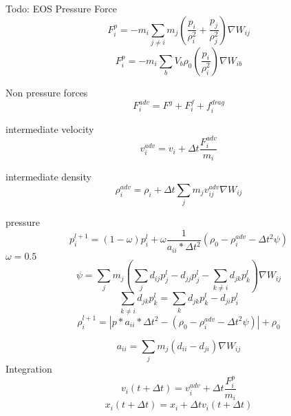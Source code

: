 \documentclass[intern]{cgMA}
\begin{document}
    Todo: EOS
    Pressure Force
    \begin{equation}
        F_i^p = -m_i \sum_{j \neq i} m_j (\frac{p_i}{\rho_i^2} + \frac{p_j}{\rho_j^2})  \nabla W_{ij}
    \end{equation}
    \begin{equation}
        F_i^p = -m_i \sum_{b} V_b \rho_0 (\frac{p_i}{\rho_i^2}) \nabla W_{ib}
    \end{equation}

    Non pressure forces
    \begin{equation}
        F_i^{adv} = F^g + F_i^f + f_i^{drag}
    \end{equation}

    intermediate velocity
    \begin{equation}
        v_i^{adv} = v_i + \Delta t \frac{F_i^{adv}}{m_i}
    \end{equation}

    intermediate density
    \begin{equation}
        \rho_i^{adv} = \rho_i + \Delta t \sum_j m_j v_{ij}^{adv} \nabla W_{ij}
    \end{equation}

    pressure
    \begin{equation}
        p_i^{l+1} = (1 - \omega) p_i^l + \omega \frac{1}{a_{ii} * \Delta t^2} (\rho_0 - \rho_i^{adv} - \Delta t^2 \psi)
    \end{equation}
    $\omega = 0.5$
    \begin{equation}
        \psi = \sum_j m_j (\sum_j d_{ij}p_j^l - d_{jj}p_j^l - \sum_{k \neq i} d_{jk}p_k^l) \nabla W_{ij}
    \end{equation}
    \begin{equation}
        \sum_{k \neq i} d_{jk}p_k^l = \sum_{k} d_{jk}p_k^l - d_{ji}p_i^l
    \end{equation}
    \begin{equation}
        \rho_i^{l+1} = |p * a_{ii} * \Delta t^2 - (\rho_0 - \rho_i^{adv} - \Delta t^2 \psi)| + \rho_0
    \end{equation}

    \begin{equation}
        a_{ii} = \sum_j m_j (d_{ii} - d_{ji}) \nabla W_{ij}
    \end{equation}
    Integration
    \begin{equation}
        v_i(t + \Delta t) = v_i^{adv} + \Delta t \frac{F_i^p}{m_i}
    \end{equation}
    \begin{equation}
        x_i(t + \Delta t) = x_i + \Delta t v_i(t + \Delta t)
    \end{equation}
    
\end{document}
